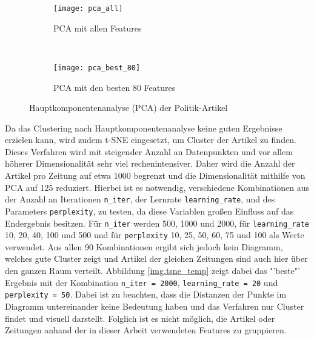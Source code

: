 \begin{figure}
  \centering
  \begin{subfigure}[b]{0.49\textwidth}
      \texttt{[image: pca\_all]}
      \caption{PCA mit allen Features}
      \label{fig:pca_all}
  \end{subfigure}
  ~ %
  \begin{subfigure}[b]{0.49\textwidth}
      \texttt{[image: pca\_best\_80]}
      \caption{PCA mit den besten 80 Features}
      \label{fig:pca_best_80}
  \end{subfigure}
  \caption{Hauptkomponentenanalyse (PCA) der Politik-Artikel}\label{fig:pca}
\end{figure}

Da das Clustering nach Hauptkomponentenanalyse keine guten Ergebnisse erzielen kann, wird zudem t-SNE eingesetzt, um Cluster der Artikel zu finden. Dieses Verfahren wird mit steigender Anzahl an Datenpunkten und vor allem höherer Dimensionalität sehr viel rechenintensiver. Daher wird die Anzahl der Artikel pro Zeitung auf etwa 1000 begrenzt und die Dimensionalität mithilfe von PCA auf 125 reduziert. Hierbei ist es notwendig, verschiedene Kombinationen aus der Anzahl an Iterationen \texttt{n\_iter}, der Lernrate \texttt{learning\_rate}, und des Parameters \texttt{perplexity}, zu testen, da diese Variablen großen Einfluss auf das Endergebnis besitzen. Für \texttt{n\_iter} werden 500, 1000 und 2000, für \texttt{learning\_rate} 10, 20, 40, 100 und 500 und für \texttt{perplexity} 10, 25, 50, 60, 75 und 100 als Werte verwendet. Aus allen 90 Kombinationen ergibt sich jedoch kein Diagramm, welches gute Cluster zeigt und Artikel der gleichen Zeitungen sind auch hier über den ganzen Raum verteilt. Abbildung \ref{img.tsne_temp} zeigt dabei das "'beste"' Ergebnis mit der Kombination \texttt{n\_iter = 2000}, \texttt{learning\_rate = 20} und \texttt{perplexity = 50}. Dabei ist zu beachten, dass die Distanzen der Punkte im Diagramm untereinander keine Bedeutung haben und das Verfahren nur Cluster findet und visuell darstellt. Folglich ist es nicht möglich, die Artikel oder Zeitungen anhand der in dieser Arbeit verwendeten Features zu gruppieren.


